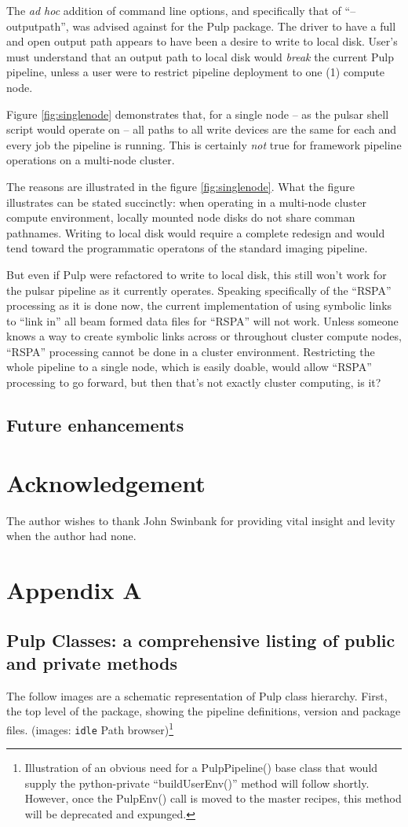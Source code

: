 \documentclass[a4paper,10pt,bibtotoc]{scrartcl}
\begin{document}
The \emph{ad hoc} addition of command line options, and
specifically that of  ``--outputpath'',  was advised against for
the Pulp package.  The driver to have a full and open output path appears
to have been a desire to write to local disk.  User's must understand
that an output path to local disk would \emph{break} the current Pulp
pipeline, unless a user were to restrict pipeline deployment to one
(1) compute node.


Figure \ref{fig:singlenode}  demonstrates that, for a single node --
as the pulsar shell script  would operate on -- all paths to all write
devices are the same for each and every job the pipeline is
running. This is certainly \emph{not} true for framework pipeline
  operations on a multi-node cluster.

The reasons are illustrated in the figure \ref{fig:singlenode}.  What
the figure illustrates can be stated succinctly: when operating in a
multi-node cluster compute environment, locally mounted node disks do
not share comman pathnames.  Writing to local disk would require a
complete redesign and would tend toward the programmatic operatons of
the standard imaging pipeline.

But even if Pulp were refactored to write to local disk, this still
won't work for the pulsar pipeline as it currently operates.  Speaking
specifically of the ``RSPA'' processing as it is done now, the current
implementation of using symbolic links to ``link in'' all beam formed
data files for ``RSPA'' will not work.  Unless someone knows a way to
create symbolic links across or throughout cluster compute nodes,
``RSPA'' processing cannot be done in a cluster environment.
Restricting the whole pipeline to a single node, which is easily
doable, would allow ``RSPA'' processing to go forward, but then that's
not exactly cluster computing, is it?

\subsection{Future enhancements}
\section{Acknowledgement}
The author wishes to thank John Swinbank for providing vital insight
and levity when the author had none.
\newpage
\section{Appendix A}
\subsection{Pulp Classes: a comprehensive listing of public and private methods}
\label{sec:future-enhancements}
The follow images are a schematic representation of Pulp class
hierarchy.  First, the top level of the package, showing the pipeline
definitions, version and package files. (images: \verb|idle| Path
browser)\footnote{Illustration of an obvious need for a PulpPipeline()
 base class that would supply the python-private ``buildUserEnv()''
 method will follow shortly. However, once the PulpEnv() call is moved to
 the master recipes, this method will be deprecated and expunged.}
\end{document}
